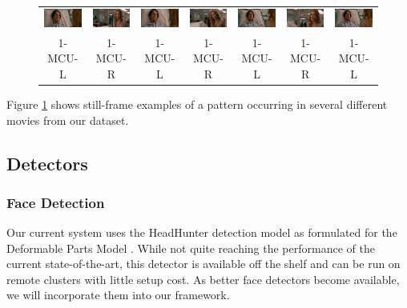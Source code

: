 \begin{figure}
\begin{center}
\begin{tabular}{c c c c c c c}
\includegraphics[width=0.11\linewidth]
  {fig/pat1/thisIs40/01.jpg}
& \includegraphics[width=0.11\linewidth]
  {fig/pat1/thisIs40/02.jpg}
& \includegraphics[width=0.11\linewidth]
  {fig/pat1/thisIs40/03.jpg}
& \includegraphics[width=0.11\linewidth]
  {fig/pat1/thisIs40/04.jpg}
& \includegraphics[width=0.11\linewidth]
  {fig/pat1/thisIs40/05.jpg}
& \includegraphics[width=0.11\linewidth]
  {fig/pat1/thisIs40/06.jpg}
& \includegraphics[width=0.11\linewidth]
  {fig/pat1/thisIs40/07.jpg}
\\
\large{1-MCU-L} & \large{1-MCU-R} 
& \large{1-MCU-L} & \large{1-MCU-R} 
& \large{1-MCU-L} & \large{1-MCU-R} 
& \large{1-MCU-L} \\

\end{tabular}
\end{center}
\label{fig:pat1}
\end{figure}

Figure \ref{fig:pat1} shows still-frame examples of a pattern occurring in several different movies from our dataset. 

    

\subsection*{Detectors}
\subsubsection*{Face Detection}
Our current system uses the HeadHunter \cite{mathias_face_2014} detection model as formulated for the Deformable Parts Model \cite{lsvm-pami}. While not quite reaching the performance of the current state-of-the-art, this detector is available off the shelf and can be run on remote clusters with little setup cost. As better face detectors become available, we will incorporate them into our framework.


